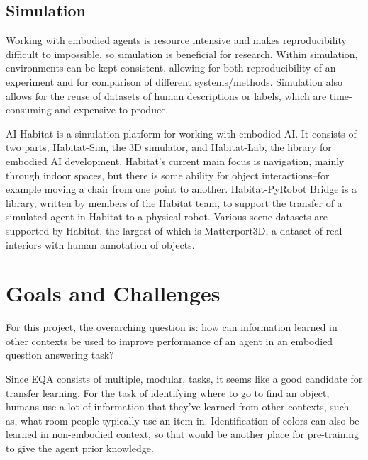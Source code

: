 \documentclass{article}
\begin{document}
\subsection{Simulation}
Working with embodied agents is resource intensive and makes reproducibility difficult to impossible, so simulation is beneficial for research. Within simulation, environments can be kept consistent, allowing for both reproducibility of an experiment and for comparison of different systems/methods. Simulation also allows for the reuse of datasets of human descriptions or labels, which are time-consuming and expensive to produce.

AI Habitat is a simulation platform for working with embodied AI\cite{habitat19iccv}. It consists of two parts, Habitat-Sim, the 3D simulator, and Habitat-Lab, the library for embodied AI development. Habitat's current main focus is navigation, mainly through indoor spaces, but there is some ability for object interactions--for example moving a chair from one point to another. Habitat-PyRobot Bridge is a library, written by members of the Habitat team, to support the transfer of a simulated agent in Habitat to a physical robot\cite{Kadian_2020}. Various scene datasets are supported by Habitat, the largest of which is Matterport3D, a dataset of real interiors with human annotation of objects\cite{matterport}.


\section{Goals and Challenges}

For this project, the overarching question is: how can information learned in other contexts be used to improve performance of an agent in an embodied question answering task? %

Since EQA consists of multiple, modular, tasks, it seems like a good candidate for transfer learning. For the task of identifying where to go to find an object, humans use a lot of information that they've learned from other contexts, such as, what room people typically use an item in. Identification of colors can also be learned in non-embodied context, so that would be another place for pre-training to give the agent prior knowledge. 
\end{document}
